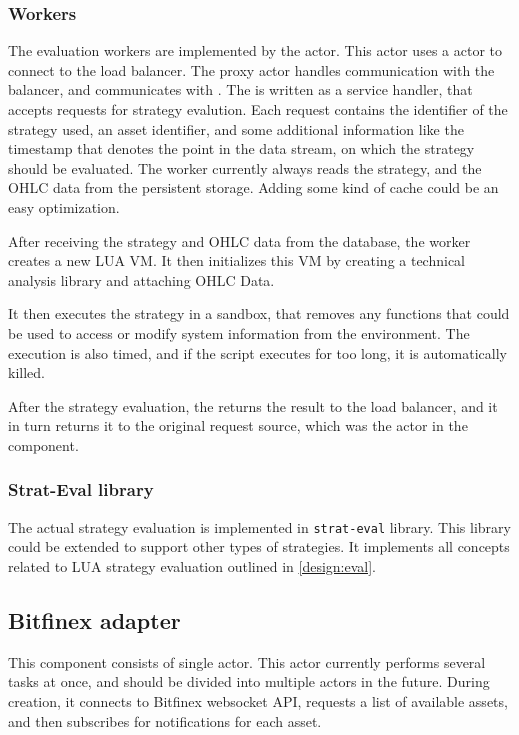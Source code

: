 \subsubsection{Workers}
The evaluation workers are implemented by the  actor. This actor uses a 
actor to connect to the load balancer. The proxy actor handles communication with the balancer, and
communicates with . The  is written as a service handler, that accepts requests
for strategy evalution. Each request contains the identifier of the strategy used, an asset identifier,
and some additional information like the timestamp that denotes the point in the data stream, on which
the strategy should be evaluated. The worker currently always reads the strategy, and the OHLC data from the
persistent storage. Adding some kind of cache could be an easy optimization.

After receiving the strategy and OHLC data from the database, the worker creates a new LUA VM. It then
initializes this VM by creating a technical analysis library and attaching OHLC Data.

It then executes the strategy in a sandbox, that removes any functions that could be used to access or modify
system information from the environment. The execution is also timed, and if the script executes for too long, it is
automatically killed.

After the strategy evaluation, the  returns the result to the load balancer, and it in turn returns it
to the original request source, which was the  actor in the  component.

\subsubsection{Strat-Eval library}
The actual strategy evaluation is implemented in \verb|strat-eval| library. This library could be extended to support other types of
strategies. It implements all concepts related to LUA strategy evaluation outlined in \autoref{design:eval}.


\subsection{Bitfinex adapter}
This component consists of single actor. This actor currently performs several tasks at once, and should be
divided into multiple actors in the future. During creation, it connects to Bitfinex websocket API,
requests a list of available assets, and then subscribes for notifications for each asset.

